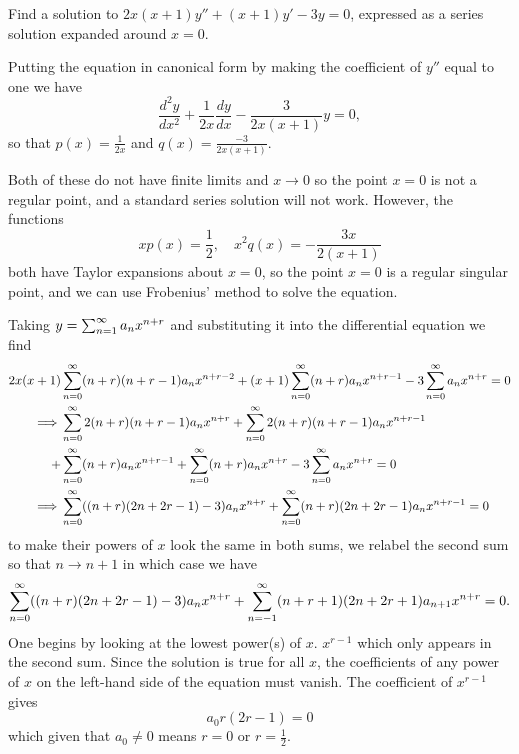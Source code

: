 \documentclass[10pt, a4paper]{article}
\begin{document}
\begin{example}
    Find a solution to $2x(x + 1)y'' + (x + 1)y' - 3y = 0$,
    expressed as a series solution expanded around $x = 0$.

    \begin{solution}
        Putting the equation in canonical form by making the coefficient of $y''$ equal to one we have
        \[
        \frac{d ^ 2y}{dx ^ 2} + \frac{1}{2x}\frac{dy}{dx} - \frac{3}{2x(x + 1)}y = 0,
        \]
        so that $p(x) = \frac{1}{2x}$ and $q(x) = \frac{-3}{2x(x + 1)}$.

        Both of these do not have finite limits and $x \rightarrow 0$ so the point $x = 0$ is not a regular point,
        and a standard series solution will not work.
        However,
        the functions
        \[
        xp(x) = \frac{1}{2},\quad x ^ 2q(x) = -\frac{3x}{2(x + 1)}
        \]
        both have Taylor expansions about $x = 0$,
        so the point $x = 0$ is a regular singular point,
        and we can use Frobenius' method to solve the equation.

        Taking $y = \infsum[n = 1]a_nx ^ {n + r}$ and substituting it into the differential equation we find
        \begin{align*}
            2x(x + 1)&\infsum[n = 0](n + r)(n + r - 1)a_nx ^ {n + r - 2} + (x + 1)\infsum[n = 0](n + r)a_nx ^ {n + r - 1} - 3\infsum[n = 0]a_nx ^ {n + r} = 0 \\
            \implies &\infsum[n = 0]2(n + r)(n + r - 1)a_nx ^ {n + r} + \infsum[n = 0]2(n + r)(n + r - 1)a_nx ^ {n + r - 1} \\
            +&\infsum[n = 0](n + r)a_nx ^ {n + r - 1} + \infsum[n = 0](n + r)a_nx ^ {n + r} - 3\infsum[n = 0]a_nx ^ {n + r} = 0 \\
            \implies &\infsum[n = 0]((n + r)(2n + 2r - 1) - 3)a_nx ^ {n + r} + \infsum[n = 0](n + r)(2n + 2r - 1)a_nx ^ {n + r - 1} = 0
        \end{align*}
        to make their powers of $x$ look the same in both sums,
        we relabel the second sum so that $n \rightarrow n + 1$ in which case we have
        \[
        \infsum[n = 0]((n + r)(2n + 2r - 1) - 3)a_nx ^ {n + r} + \infsum[n = -1](n + r + 1)(2n + 2r + 1)a_{n + 1}x ^ {n + r} = 0.
        \]
        One begins by looking at the lowest power(s) of $x$.
        $x ^ {r - 1}$ which only appears in the second sum.
        Since the solution is true for all $x$,
        the coefficients of any power of $x$ on the left-hand side of the equation must vanish.
        The coefficient of $x ^ {r - 1}$ gives
        \[
        a_0r(2r - 1) = 0
        \]
        which given that $a_0 \neq 0$ means $r = 0$ or $r = \frac{1}{2}$.


\end{solution}
\end{example}
\end{document}
